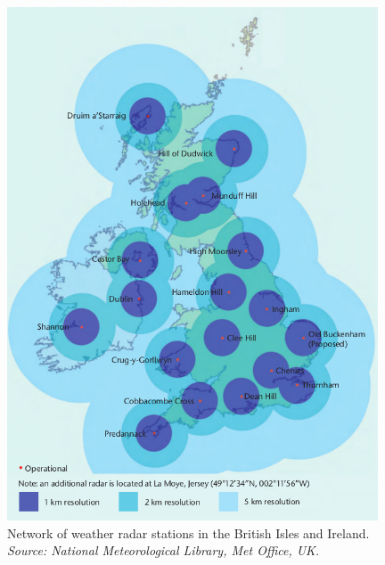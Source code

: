 \begin{figure}[htb]
\includegraphics[width=11cm]{chp_radar/radar.png}
\caption{Network of weather radar stations in the British Isles and Ireland. \textit{Source: National Meteorological Library, Met Office, UK.}}
\label{fig_radar_map}
\end{figure}


